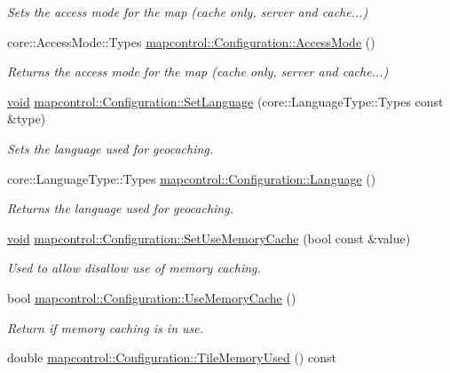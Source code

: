 \begin{DoxyCompactItemize}
\begin{DoxyCompactList}\small\item\em \-Sets the access mode for the map (cache only, server and cache...) \end{DoxyCompactList}\item 
core\-::\-Access\-Mode\-::\-Types \hyperlink{group___o_p_map_widget_ga902ee11abd0b7c7634bfbadf5bd73517}{mapcontrol\-::\-Configuration\-::\-Access\-Mode} ()
\begin{DoxyCompactList}\small\item\em \-Returns the access mode for the map (cache only, server and cache...) \end{DoxyCompactList}\item 
\hyperlink{group___u_a_v_objects_plugin_ga444cf2ff3f0ecbe028adce838d373f5c}{void} \hyperlink{group___o_p_map_widget_ga29b42ec96098c35b537e64d33d6c41b5}{mapcontrol\-::\-Configuration\-::\-Set\-Language} (core\-::\-Language\-Type\-::\-Types const \&type)
\begin{DoxyCompactList}\small\item\em \-Sets the language used for geocaching. \end{DoxyCompactList}\item 
core\-::\-Language\-Type\-::\-Types \hyperlink{group___o_p_map_widget_ga0058ff0ad6bf530d4e7ce0399a14a39c}{mapcontrol\-::\-Configuration\-::\-Language} ()
\begin{DoxyCompactList}\small\item\em \-Returns the language used for geocaching. \end{DoxyCompactList}\item 
\hyperlink{group___u_a_v_objects_plugin_ga444cf2ff3f0ecbe028adce838d373f5c}{void} \hyperlink{group___o_p_map_widget_ga323ea9b6071044204ce278734ef855fb}{mapcontrol\-::\-Configuration\-::\-Set\-Use\-Memory\-Cache} (bool const \&value)
\begin{DoxyCompactList}\small\item\em \-Used to allow disallow use of memory caching. \end{DoxyCompactList}\item 
bool \hyperlink{group___o_p_map_widget_ga07a1c9decb34a05e0337db285bb15bc3}{mapcontrol\-::\-Configuration\-::\-Use\-Memory\-Cache} ()
\begin{DoxyCompactList}\small\item\em \-Return if memory caching is in use. \end{DoxyCompactList}\item 
double \hyperlink{group___o_p_map_widget_gaf1e79ea822cc04fd7bc6f9b566c19224}{mapcontrol\-::\-Configuration\-::\-Tile\-Memory\-Used} () const 

\end{DoxyCompactItemize}
